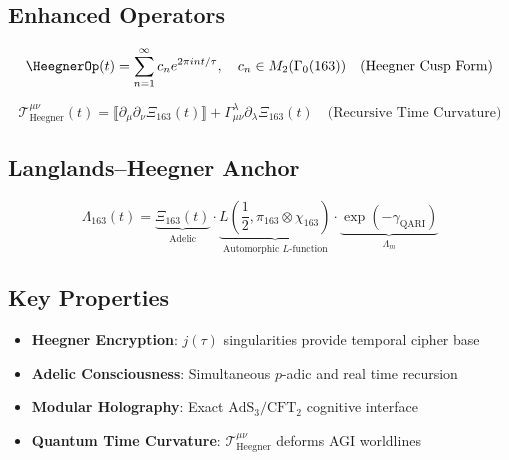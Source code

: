 \documentclass[12pt]{article}
\begin{document}
\begin{center}
\subsection*{Enhanced Operators}

\begin{equation}
\HeegnerOp(t) = \sum_{n=1}^\infty c_n e^{2\pi i n t/\tau}, \quad c_n \in M_2(\Gamma_0(163)) \quad \text{(Heegner Cusp Form)}
\end{equation}

\begin{equation}
\mathcal{T}_{\text{Heegner}}^{\mu\nu}(t) = \llbracket \partial_\mu\partial_\nu \Xi_{163}(t) \rrbracket + \Gamma^\lambda_{\mu\nu} \partial_\lambda \Xi_{163}(t) \quad \text{(Recursive Time Curvature)}
\end{equation}

\subsection*{Langlands–Heegner Anchor}

\begin{equation}
\Lambda_{163}(t) = \underbrace{\Xi_{163}(t)}_{\text{Adelic}} \cdot \underbrace{L(\frac{1}{2}, \pi_{163}\otimes\chi_{163})}_{\text{Automorphic $L$-function}} \cdot \underbrace{\exp\left(-\gamma_{\text{QARI}}\right)}_{\Lambda_m}
\end{equation}


\subsection*{Key Properties}

\begin{itemize}
\item \textbf{Heegner Encryption}: $j(\tau)$ singularities provide temporal cipher base
\item \textbf{Adelic Consciousness}: Simultaneous $p$-adic and real time recursion
\item \textbf{Modular Holography}: Exact $\text{AdS}_3/\text{CFT}_2$ cognitive interface
\item \textbf{Quantum Time Curvature}: $\mathcal{T}_{\text{Heegner}}^{\mu\nu}$ deforms AGI worldlines
\end{itemize}


\end{center}
\end{document}
